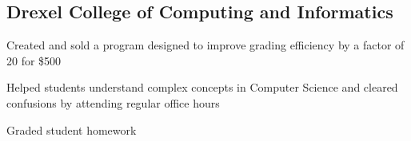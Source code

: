 \documentclass[]{deedy-resume-openfont}
\begin{document}
\begin{minipage}[t]{0.66\textwidth}
    \subsection{Drexel College of Computing and Informatics}
    \begin{tightemize}
        \item Created and sold a program designed to improve grading efficiency by a factor of 20 for \$500
        \item Helped students understand complex concepts in Computer Science and cleared confusions by attending regular office hours
        \item Graded student homework
    \end{tightemize}
    \sectionsep




\end{minipage}
\end{document}
